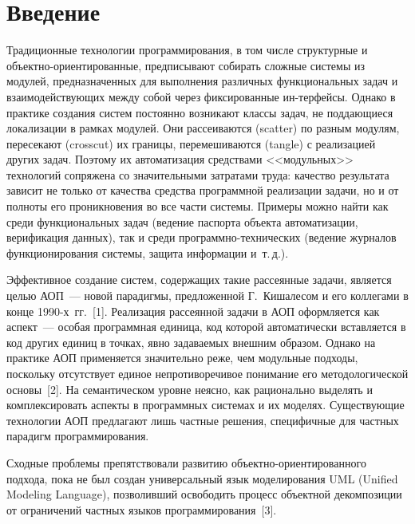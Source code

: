       \begin{multicols}{2}

            \label{st\stat}


\section{Введение}

   Традиционные технологии программирования, в том числе структурные и 
объект\-но-ориен\-ти\-ро\-ван\-ные, предписывают собирать сложные сис\-те\-мы\linebreak 
из модулей, предназначенных для выполнения различ\-ных функциональных 
задач и взаимо\-дей\-ст\-ву\-ющих между собой через фиксированные ин-\linebreak терфейсы. 
Однако в практике создания сис\-тем постоянно возникают классы задач, не 
поддающиеся локализации в рамках модулей. Они рассеиваются (scatter) по 
разным модулям, пересекают (crosscut) их границы, перемешиваются (tangle) с 
реализацией других задач. Поэтому их автоматизация средствами 
<<модульных>> технологий сопряжена со значительными затратами труда: 
качество результата зависит не только от качества средства программной 
реализации задачи, но и от полноты его проникновения во все части системы. 
Примеры можно найти как среди функциональных задач (ведение паспорта 
объекта автоматизации, верификация данных), так и среди про\-грам\-мно-тех\-ни\-че\-ских 
(ведение журналов функционирования системы, защита 
информации и~т.\,д.).
   
   Эффективное создание систем, содержащих такие рассеянные задачи, 
является целью АОП~--- новой парадигмы, предложенной Г.~Кишалесом и его коллегами в 
конце 1990-х~гг.~[1]. Реализация рассеянной задачи в АОП оформляется как 
аспект~--- особая программная единица, код которой автоматически 
вставляется в код других единиц в точках, явно задаваемых внешним образом. 
Однако на практике АОП применяется значительно реже, чем модульные 
подходы, поскольку отсутствует единое непротиворечивое понимание его 
методологической основы~[2]. На семантическом уровне неясно, как 
рационально выделять и комплексировать аспекты в программных системах и 
их моделях. Существующие технологии АОП предлагают лишь частные 
решения, специфичные для частных парадигм программирования. 

Сходные 
проблемы препятствовали развитию объ\-ект\-но-ори\-ен\-ти\-ро\-ван\-но\-го 
подхода, пока не был создан универсальный язык моделирования UML (Unified
Modeling Language), 
позволивший освободить процесс объектной декомпозиции от ограничений 
частных языков программирования~[3].
   

\end{multicols}
